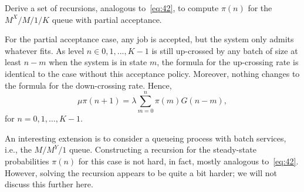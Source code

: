 \begin{extra}
  Derive a set of recursions, analogous to~\cref{eq:42}, to compute $\pi(n)$ for the $M^X/M/1/K$ queue with partial acceptance.
\begin{solution}
  For the partial acceptance case, any job is accepted, but the system only admits whatever fits.
  As level $n\in {0,1,...,K-1}$ is still up-crossed by any batch of size at least $n-m$ when the system is in state $m$, the formula for the up-crossing rate is identical to the case without this acceptance policy.
  Moreover, nothing changes to the formula for the down-crossing rate.
  Hence,
  \begin{equation*}
    \mu \pi(n+1) = \lambda \sum_{m=0}^n \pi(m) G(n-m), 
  \end{equation*}
  for $n=0,1,\ldots, K-1$. 
\end{solution}
\end{extra}


\begin{extra}[\faRocket]
  An interesting extension is to consider a queueing process with batch services, i.e., the $M/M^Y/1$ queue.
  Constructing a recursion for the steady-state probabilities $\pi(n)$ for this case is not hard, in fact, mostly analogous to~\cref{eq:42}.
  However, solving the recursion appears to be quite a bit harder; we will not discuss this further here.
\end{extra}





